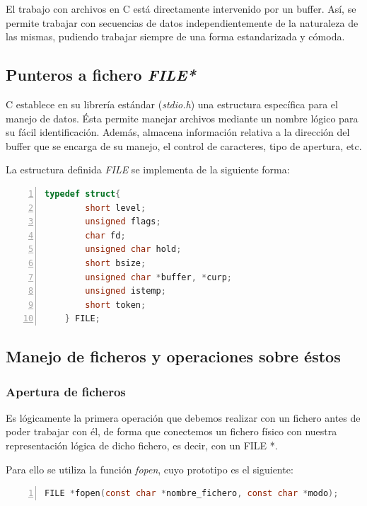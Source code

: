 \documentclass[a4paper, 11pt, titlepage]{article}
\begin{document}
            El trabajo con archivos en C está directamente intervenido por un buffer. Así, se permite trabajar
            con secuencias de datos independientemente de la naturaleza de las mismas, pudiendo trabajar 
            siempre de una forma estandarizada y cómoda.

    \subsection{Punteros a fichero \textit{FILE*}}

        C establece en su librería estándar (\textit{stdio.h}) una estructura específica para el manejo 
        de datos. Ésta permite manejar archivos mediante un nombre lógico para su fácil identificación.
        Además, almacena información relativa a la dirección del buffer que se encarga de su manejo, el 
        control de caracteres, tipo de apertura, etc.

        La estructura definida \textit{FILE} se implementa de la siguiente forma:

        \begin{lstlisting}[language=C,numbers=left]
    typedef struct{
        short level;
        unsigned flags;
        char fd;
        unsigned char hold;
        short bsize;
        unsigned char *buffer, *curp;
        unsigned istemp;
        short token;
    } FILE; \end{lstlisting}
    

    \subsection{Manejo de ficheros y operaciones sobre éstos}

        \subsubsection{Apertura de ficheros}

            Es lógicamente la primera operación que debemos realizar con un fichero antes de poder 
            trabajar con él, de forma que conectemos un fichero físico con nuestra representación lógica 
            de dicho fichero, es decir, con un FILE *.

            Para ello se utiliza la función \textit{fopen}, cuyo prototipo es el siguiente:

            \begin{lstlisting}[language=C,numbers=left,basicstyle=\small]
    FILE *fopen(const char *nombre_fichero, const char *modo);\end{lstlisting}
\end{document}

